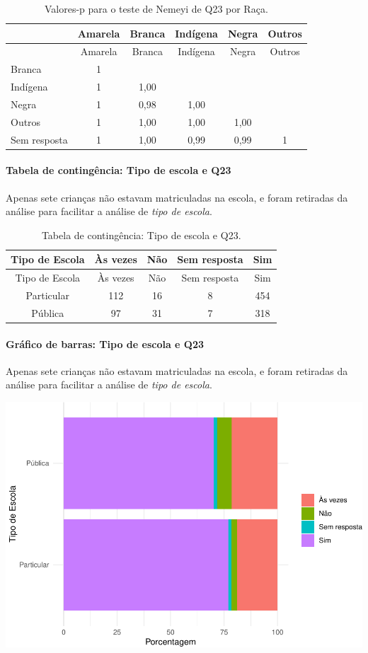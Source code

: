 \documentclass[]{article}
\let\oldparagraph\paragraph
\renewcommand{\paragraph}[1]{\oldparagraph{#1}\mbox{}}
\begin{document}
\begin{longtable}[]{@{}lccccc@{}}
\caption{\label{tab:unnamed-chunk-582}Valores-p para o teste de Nemeyi de Q23 por Raça.}\tabularnewline
\toprule
& Amarela & Branca & Indígena & Negra & Outros\tabularnewline
\midrule
\endfirsthead
\toprule
& Amarela & Branca & Indígena & Negra & Outros\tabularnewline
\midrule
\endhead
Branca & 1 & & & &\tabularnewline
Indígena & 1 & 1,00 & & &\tabularnewline
Negra & 1 & 0,98 & 1,00 & &\tabularnewline
Outros & 1 & 1,00 & 1,00 & 1,00 &\tabularnewline
Sem resposta & 1 & 1,00 & 0,99 & 0,99 & 1\tabularnewline
\bottomrule
\end{longtable}

\cleardoublepage

\hypertarget{tabela-de-continguxeancia-tipo-de-escola-e-q23}{%
\paragraph{Tabela de contingência: Tipo de escola e Q23}\label{tabela-de-continguxeancia-tipo-de-escola-e-q23}}

Apenas sete crianças não estavam matriculadas na escola, e foram retiradas da análise para facilitar a análise de \emph{tipo de escola}.

\begin{longtable}[]{@{}ccccc@{}}
\caption{\label{tab:unnamed-chunk-583}Tabela de contingência: Tipo de escola e Q23.}\tabularnewline
\toprule
Tipo de Escola & Às vezes & Não & Sem resposta & Sim\tabularnewline
\midrule
\endfirsthead
\toprule
Tipo de Escola & Às vezes & Não & Sem resposta & Sim\tabularnewline
\midrule
\endhead
Particular & 112 & 16 & 8 & 454\tabularnewline
Pública & 97 & 31 & 7 & 318\tabularnewline
\bottomrule
\end{longtable}

\hypertarget{gruxe1fico-de-barras-tipo-de-escola-e-q23}{%
\paragraph{Gráfico de barras: Tipo de escola e Q23}\label{gruxe1fico-de-barras-tipo-de-escola-e-q23}}

Apenas sete crianças não estavam matriculadas na escola, e foram retiradas da análise para facilitar a análise de \emph{tipo de escola}.

\begin{center}\includegraphics[width=0.75\linewidth]{relatorio_covid19_files/figure-latex/unnamed-chunk-584-1} \end{center}
\end{document}
